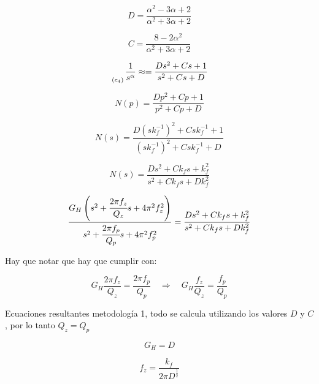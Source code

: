 		\begin{equation}
			D = \frac{\alpha^{2} - 3 \alpha + 2}{\alpha^{2} + 3\alpha + 2}
		\end{equation}
		
		\begin{equation}
			C = \frac{8 - 2 \alpha^{2}}{\alpha^{2} +  3 \alpha + 2}
		\end{equation}
		
		\begin{equation}
			\genfrac{}{}{0pt}{0}{}{_{(c_{4})}} \frac{1}{s^{\alpha}} \approx = \frac{D s^{2} + Cs + 1}{s^{2} + Cs + D}
		\end{equation}
		
		\begin{equation}
			N(p) = \frac{D p^{2} + Cp + 1}{p^{2} + Cp + D}
		\end{equation}
		
		\begin{equation}
			N(s) = \frac{D (sk_{f}^{-1})^{2} + Csk_{f}^{-1} + 1}{(sk_{f}^{-1})^{2} + Csk_{f}^{-1} + D}
		\end{equation}
		
		\begin{equation}
			N(s) = \frac{D s^{2} + C k_{f}s + k_{f}^{2}}{s^{2} + C k_{f}s + Dk_{f}^{2}}
		\end{equation}
		
		\begin{equation}
			\frac{G_{H} \left(  s^{2} + \cfrac{2 \pi f_{z}}{Q_{z}} s + 4 \pi^{2} f_{z}^{2} \right)}{s^{2} + \cfrac{2 \pi f_{p}}{Q_{p}}s + 4\pi^{2} f_{p}^{2} } = \frac{D s^{2} + C k_{f}s + k_{f}^{2}}{s^{2} + C k_{f}s + Dk_{f}^{2}}
		\end{equation}
		
		
		Hay que notar que hay que cumplir con:
		
		\begin{equation}
			G_{H} \frac{2 \pi f_{z}}{Q_{z}} = \frac{2 \pi f_{p}}{Q_{p}} \quad \Rightarrow \quad  G_{H} \frac{f_{z}}{Q_{z}} = \frac{f_{p}}{Q_{p}}
		\end{equation}
		
		Ecuaciones resultantes metodología 1, todo se calcula utilizando los valores $D$ y $C$, por lo tanto $Q_{z} = Q_{p}$
		
		\begin{equation}
			G_{H} = D
		\end{equation}
		
		\begin{equation}
			f_{z} = \frac{k_{f}}{2 \pi D^{\frac{1}{2}}}
		\end{equation}
		
